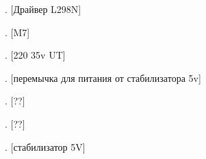 . [Драйвер L298N]
\begin{figure}[H]
  \centering
\end{figure}

. [M7]
\begin{figure}[H]
  \centering
\end{figure}

. [220 35v UT]
\begin{figure}[H]
  \centering
\end{figure}

. [перемычка для питания от стабилизатора 5v]
\begin{figure}[H]
  \centering
\end{figure}

. [??]
\begin{figure}[H]
  \centering
\end{figure}

. [??]
\begin{figure}[H]
  \centering
\end{figure}

. [стабилизатор 5V]
\begin{figure}[H]
  \centering
\end{figure}


